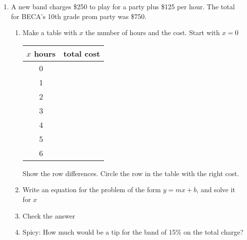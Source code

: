 \documentclass[12pt, oneside]{article}
\begin{document}
\begin{enumerate}
\newpage


  \item A new band charges \$250 to play for a party plus \$125 per hour. The total for BECA's 10th grade prom party was \$750.
  \begin{enumerate}
    \item Make a table with $x$ the number of hours and the cost. Start with $x=0$ \\[0.5cm]
    \renewcommand{\arraystretch}{1.6}
    \begin{center}
      \begin{tabular}{|c|r|}
      \hline
      $x$ hours & total cost\\
      \hline
      0 &  \\
      \hline
      1 &  \\
      \hline
      2 &  \\
      \hline
      3 &  \\
      \hline
      4 &  \\
      \hline
      5 &  \\
      \hline
      6 &  \\
      \hline
      \end{tabular}
    \end{center}
    Show the row differences. Circle the row in the table with the right cost.
    \vspace{1cm}

    \item Write an equation for the problem of the form $y=mx+b$, and solve it for $x$ \vspace{3.5cm}
    \item Check the answer \vspace{2.5cm}
    \item Spicy: How much would be a tip for the band of 15\% on the total charge?
  \end{enumerate}


\end{enumerate}
\end{document}
